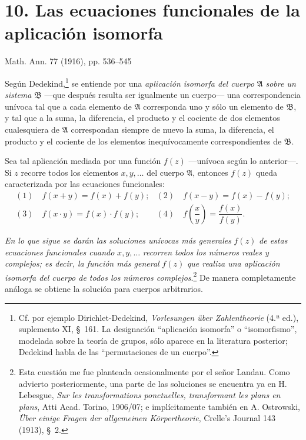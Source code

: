 \section*{10. Las ecuaciones funcionales de la aplicación isomorfa}
\begin{center}
Math. Ann. 77 (1916), pp. 536--545
\end{center}

Según Dedekind,\footnote{Cf. por ejemplo Dirichlet-Dedekind, \emph{Vorlesungen über Zahlentheorie} (4.ª ed.), suplemento XI, \S\ 161. La designación ``aplicación isomorfa'' o ``isomorfismo'', modelada sobre la teoría de grupos, sólo aparece en la literatura posterior; Dedekind habla de las ``permutaciones de un cuerpo''.} se entiende por una \emph{aplicación isomorfa del cuerpo} $\mathfrak A$ \emph{sobre un sistema} $\mathfrak B$ ---que después resulta ser igualmente un cuerpo--- una correspondencia unívoca tal que a cada elemento de $\mathfrak A$ corresponda uno y sólo un elemento de $\mathfrak B$, y tal que a la suma, la diferencia, el producto y el cociente de dos elementos cualesquiera de $\mathfrak A$ correspondan siempre de nuevo la suma, la diferencia, el producto y el cociente de los elementos inequívocamente correspondientes de $\mathfrak B$.

Sea tal aplicación mediada por una función $f(z)$ ---unívoca según lo anterior---. Si $z$ recorre todos los elementos $x,y,\ldots$ del cuerpo $\mathfrak A$, entonces $f(z)$ queda caracterizada por las ecuaciones funcionales:
\[
\begin{array}{ll}
(1)\quad f(x+y)=f(x)+f(y); & (2)\quad f(x-y)=f(x)-f(y);\\[0.45em]
(3)\quad f(x\cdot y)=f(x)\cdot f(y); & (4)\quad f\!\left(\dfrac{x}{y}\right)=\dfrac{f(x)}{f(y)}.
\end{array}
\]

\emph{En lo que sigue se darán las soluciones unívocas más generales} $f(z)$ \emph{de estas ecuaciones funcionales cuando} $x,y,\ldots$ \emph{recorren todos los números reales y complejos; es decir, la función más general} $f(z)$ \emph{que realiza una aplicación isomorfa del cuerpo de todos los números complejos}.\footnote{Esta cuestión me fue planteada ocasionalmente por el señor Landau. Como advierto posteriormente, una parte de las soluciones se encuentra ya en H. Lebesgue, \emph{Sur les transformations ponctuelles, transformant les plans en plans}, Atti Acad. Torino, 1906/07; e implícitamente también en A. Ostrowski, \emph{Über einige Fragen der allgemeinen Körpertheorie}, Crelle's Journal 143 (1913), \S\ 2.} De manera completamente análoga se obtiene la solución para cuerpos arbitrarios.


